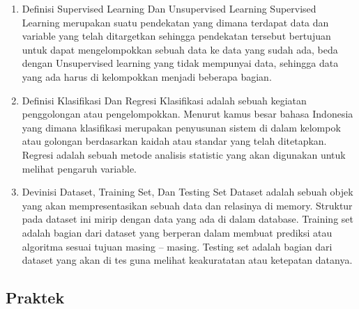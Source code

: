 	\begin{enumerate}
	\item
	Definisi Supervised Learning Dan Unsupervised Learning
	\subitem
	Supervised Learning merupakan suatu pendekatan yang dimana terdapat data dan variable yang telah ditargetkan sehingga pendekatan tersebut bertujuan untuk dapat mengelompokkan sebuah data ke data yang sudah ada, beda dengan Unsupervised learning yang tidak mempunyai data, sehingga data yang ada harus di kelompokkan menjadi beberapa bagian.
	\item
	Definisi  Klasifikasi Dan Regresi
	\subitem
	Klasifikasi adalah sebuah kegiatan penggolongan atau pengelompokkan. Menurut kamus besar bahasa Indonesia yang dimana klasifikasi merupakan penyusunan sistem di dalam kelompok atau golongan berdasarkan kaidah atau standar yang telah ditetapkan. Regresi adalah sebuah metode analisis statistic yang akan digunakan untuk melihat pengaruh variable.
	\item
	Devinisi Dataset, Training Set, Dan Testing Set
	\subitem
	Dataset adalah sebuah objek yang akan mempresentasikan sebuah data dan relasinya di memory. Struktur pada dataset ini mirip dengan data yang ada di dalam database. Training set adalah bagian dari dataset yang berperan dalam membuat prediksi atau algoritma sesuai tujuan masing – masing. Testing set adalah bagian dari dataset yang akan di tes guna melihat keakuratatan atau ketepatan datanya.
	\end{enumerate}

\subsection{Praktek}
